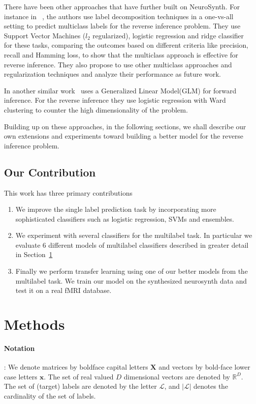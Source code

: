 \documentclass{article} %
\begin{document}
There have been other approaches that have further built on NeuroSynth. For instance in ~\cite{sanmi2013multi}, the authors use label decomposition techniques in a one-vs-all setting to predict multiclass labels for the reverse inference problem. They use Support Vector Machines ($l_2$ regularized), logistic regression and ridge classifier for these tasks,  comparing the outcomes based on different criteria like precision, recall and Hamming loss, to show that the multiclass approach is effective for reverse inference. They also propose to use other multiclass approaches and regularization techniques and analyze their performance as future work. 

In another similar work~\cite{schwartz2013mapping} uses a Generalized Linear Model(GLM) for forward inference. For the reverse inference they use logistic regression with Ward clustering to counter the high dimensionality of the problem. 

Building up on these approaches,  in the following sections, we shall describe our own extensions and experiments toward building a better model for the reverse inference problem.

\subsection{Our Contribution}
 This work has three primary contributions
\begin{enumerate}
  \item We improve the single label prediction task by incorporating more sophisticated classifiers such as logistic regression, SVMs and ensembles.
  \item We experiment with several classifiers for the multilabel task. In particular we evaluate 6 different models of multilabel classifiers described in greater detail in Section~\ref{sec:methods}
  \item Finally we perform transfer learning using one of our better models from the multilabel task. We train our model on the synthesized neurosynth data and test it on a real fMRI database.
\end{enumerate}

\section{Methods}
\label{sec:methods}
 \paragraph{Notation}: We denote matrices by boldface capital letters $\mathbf{X}$ and vectors by bold-face lower case letters $\mathbf{x}$. The set of real valued $D$ dimensional vectors are denoted by $\mathbb{R}^D$. The set of (target) labels are denoted by the letter $\mathcal{L}$, and $|\mathcal{L}|$ denotes the cardinality of the set of labels.
\end{document}
